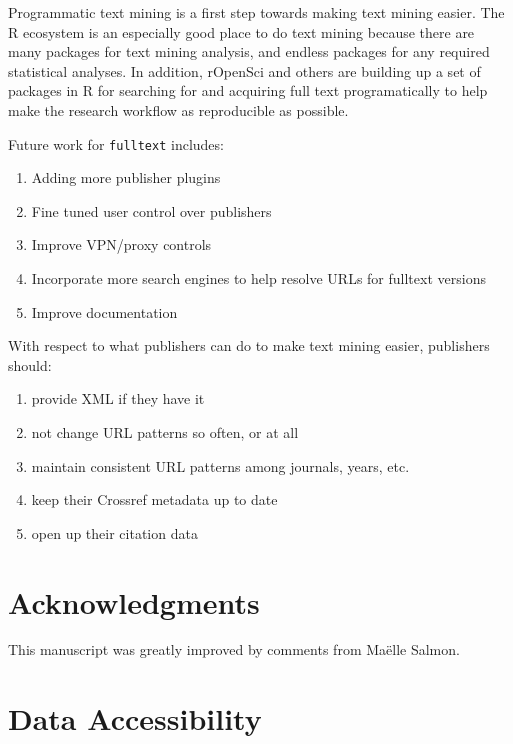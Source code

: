 \documentclass[author-year, review, 11pt]{components/elsarticle} %
\def\tightlist{}
\begin{document}
Programmatic text mining is a first step towards making text mining
easier. The R ecosystem is an especially good place to do text mining
because there are many packages for text mining analysis, and endless
packages for any required statistical analyses. In addition, rOpenSci
and others are building up a set of packages in R for searching for and
acquiring full text programatically to help make the research workflow
as reproducible as possible.

Future work for \texttt{fulltext} includes:

\begin{enumerate}
\def\labelenumi{\arabic{enumi}.}
\tightlist
\item
  Adding more publisher plugins
\item
  Fine tuned user control over publishers
\item
  Improve VPN/proxy controls
\item
  Incorporate more search engines to help resolve URLs for fulltext
  versions
\item
  Improve documentation
\end{enumerate}

With respect to what publishers can do to make text mining easier,
publishers should:

\begin{enumerate}
\def\labelenumi{\arabic{enumi}.}
\tightlist
\item
  provide XML if they have it
\item
  not change URL patterns so often, or at all
\item
  maintain consistent URL patterns among journals, years, etc.
\item
  keep their Crossref metadata up to date
\item
  open up their citation data
\end{enumerate}

\hypertarget{acknowledgments}{%
\section{Acknowledgments}\label{acknowledgments}}

This manuscript was greatly improved by comments from Maëlle Salmon.

\hypertarget{data-accessibility}{%
\section{Data Accessibility}\label{data-accessibility}}
\end{document}
